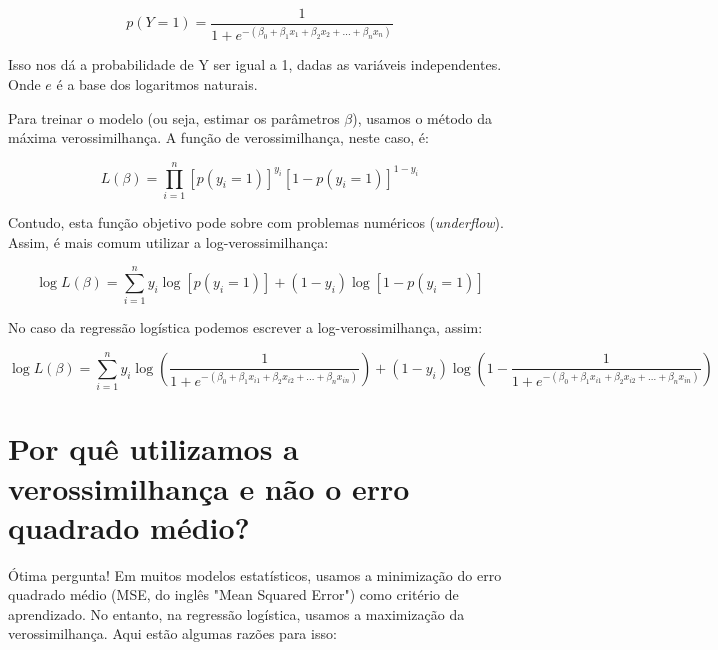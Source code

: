 \documentclass[12pt,a4paper, brazil]{article}
\begin{document}
\begin{equation}
  p(Y=1) = \frac{1}{1 + e^{-(\beta_0 + \beta_1x_1 + \beta_2x_2 + ... + \beta_nx_n)}}
\end{equation}

Isso nos dá a probabilidade de Y ser igual a 1, dadas as variáveis independentes. Onde $e$ é a base dos logaritmos naturais.

Para treinar o modelo (ou seja, estimar os parâmetros $\beta$), usamos o método da máxima verossimilhança. A função de verossimilhança, neste caso, é:

\begin{equation}
  L(\beta) = \prod_{i=1}^{n} [p(y_i=1)]^{y_i}[1-p(y_i=1)]^{1-y_i}
\end{equation}

Contudo, esta função objetivo pode sobre com problemas numéricos (\textit{underflow}). Assim, é mais comum utilizar a log-verossimilhança:

\begin{equation}
  \log L(\beta) = \sum_{i=1}^{n} y_i \log [p(y_i=1)] + (1-y_i) \log [1-p(y_i=1)]
\end{equation}

No caso da regressão logística podemos escrever a log-verossimilhança, assim:

\begin{equation}
  \log L(\beta) = \sum_{i=1}^{n} y_i \log \left( \frac{1}{1+e^{-(\beta_0 + \beta_1x_{i1} + \beta_2x_{i2} + ... + \beta_nx_{in})}} \right) + (1-y_i) \log \left(1- \frac{1}{1+e^{-(\beta_0 + \beta_1x_{i1} + \beta_2x_{i2} + ... + \beta_nx_{in})}} \right)
  \end{equation}
  
\section{Por quê utilizamos a verossimilhança e não o erro quadrado médio?}

Ótima pergunta! Em muitos modelos estatísticos, usamos a minimização do erro quadrado médio (MSE, do inglês "Mean Squared Error") como critério de aprendizado. No entanto, na regressão logística, usamos a maximização da verossimilhança. Aqui estão algumas razões para isso:
\end{document}
